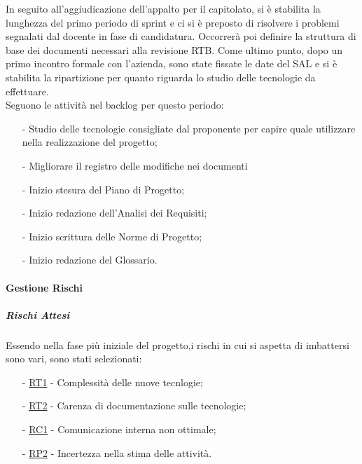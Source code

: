 \documentclass[10pt]{article}
\begin{document}
{{    In seguito all'aggiudicazione dell'appalto per il capitolato, si è stabilita la lunghezza del primo periodo di sprint e ci si è preposto di risolvere i problemi segnalati dal docente in fase di candidatura. Occorrerà poi definire la struttura di base dei documenti necessari alla revisione RTB. Come ultimo punto, dopo un primo incontro formale con l'azienda, sono state fissate le date del SAL e si è stabilita la ripartizione per quanto riguarda lo studio delle tecnologie da effettuare.\\
    Seguono le attività nel backlog per questo periodo:
    \vspace{-0.5em}
    \begin{itemize}
    \setlength\itemsep{-0.2em}
    \item [-] Studio delle tecnologie consigliate dal proponente per capire quale utilizzare nella realizzazione del progetto;
    \item [-] Migliorare il registro delle modifiche nei documenti 
    \item [-] Inizio stesura del Piano di Progetto;
    \item [-] Inizio redazione dell'Analisi dei Requisiti;
    \item [-] Inizio scrittura delle Norme di Progetto;
    \item [-] Inizio redazione del Glossario.
    \end{itemize}

    \paragraph{Gestione Rischi}\mbox{}
    \vspace{-1em}
    \subparagraph*{Rischi Attesi}\mbox{}

    Essendo nella fase più iniziale del progetto,i rischi in cui si aspetta di imbattersi sono vari, sono stati selezionati:
    \vspace{-0.5em}
    \begin{itemize}
    \setlength\itemsep{-0.2em}
    \item [-] \hyperref[RT1]{RT1} - Complessità delle nuove tecnlogie;
    \item [-] \hyperref[RT2]{RT2} - Carenza di documentazione sulle tecnologie;
    \item [-] \hyperref[RC1]{RC1} - Comunicazione interna non ottimale;
    \item [-] \hyperref[RP2]{RP2} - Incertezza nella stima delle attività.
    \end{itemize}

}}
\end{document}
